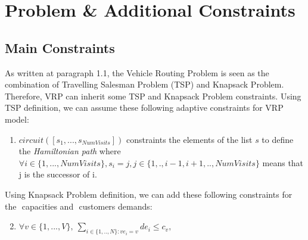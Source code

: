 \section{Problem \& Additional Constraints}
\subsection{Main Constraints}
As written at paragraph 1.1, the Vehicle Routing Problem is seen as the combination of Travelling Salesman Problem (TSP) and Knapsack Problem. Therefore, VRP can inherit some TSP and Knapsack Problem constraints.
\newline
\newline
Using TSP definition, we can assume these following adaptive constraints for VRP model:
\begin{enumerate}
    \item \begin{math}circuit([s_{1},...,s_{NumVisits}])\end{math} constraints the elements of the list \begin{math}s\end{math} to define the \textit{Hamiltonian path} where \begin{math}\forall i \in \{1,...,NumVisits\},s_{i} = j, j \in \{1,., i-1,i+1,..,NumVisits\}\end{math} means that j is the successor of i.
\end{enumerate}
Using Knapsack Problem definition, we can add these following constraints for the \begin{math}[c_{1}, ..., c_{v}]\end{math} capacities and \begin{math}[de_{1}, ..., de_{N}]\end{math} customers demands:

\begin{enumerate}
 \setcounter{enumi}{1}
    \item \begin{math} \forall v \in \{1,..., V\}, \:\sum_{i \in \{1,..,N\} : ve_{i} = v}de_{i} \leq c_{v}, \end{math}
\end{enumerate}

